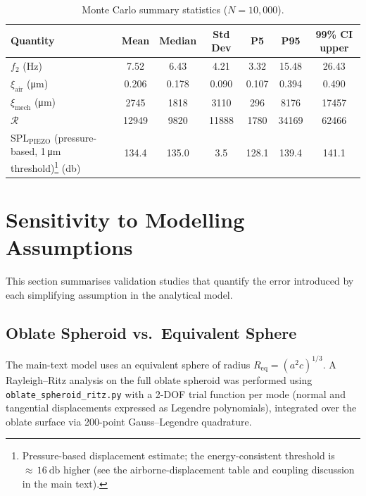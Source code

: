 \documentclass[12pt]{article}
\begin{document}
\begin{table}[htbp]
\centering
\caption{Monte Carlo summary statistics ($N = 10{,}000$).}
\label{tab:mc_summary}
\begin{tabular}{@{}lSSSSSS@{}}
\toprule
{Quantity} & {Mean} & {Median} & {Std Dev} & {P5} & {P95} & {99\% CI upper} \\
\midrule
$f_{2}$ (\si{\hertz})
  & 7.52 & 6.43 & 4.21 & 3.32 & 15.48 & 26.43 \\
$\xi_{\mathrm{air}}$ (\si{\micro\metre})
  & 0.206 & 0.178 & 0.090 & 0.107 & 0.394 & 0.490 \\
$\xi_{\mathrm{mech}}$ (\si{\micro\metre})
  & 2745 & 1818 & 3110 & 296 & 8176 & 17457 \\
$\mathcal{R}$
  & 12949 & 9820 & 11888 & 1780 & 34169 & 62466 \\
SPL$_{\mathrm{PIEZO}}$ (pressure-based, 1\,\si{\micro\metre} threshold)\footnote{Pressure-based displacement
  estimate; the energy-consistent threshold is ${\approx}\,\SI{16}{\decibel}$
  higher (see the airborne-displacement table and coupling discussion in the
  main text).} (\si{\decibel})
  & 134.4 & 135.0 & 3.5 & 128.1 & 139.4 & 141.1 \\
\bottomrule
\end{tabular}
\end{table}


\section{Sensitivity to Modelling Assumptions}
\label{sec:sensitivity}

This section summarises validation studies that quantify the error introduced
by each simplifying assumption in the analytical model.

\subsection{Oblate Spheroid vs.\ Equivalent Sphere}
\label{sec:oblate}

The main-text model uses an equivalent sphere of radius
$R_{\mathrm{eq}} = (a^{2}c)^{1/3}$.  A Rayleigh--Ritz analysis on the full
oblate spheroid was performed using
\texttt{oblate\_spheroid\_ritz.py} with a 2-DOF trial function per mode
(normal and tangential displacements expressed as Legendre polynomials),
integrated over the oblate surface via 200-point Gauss--Legendre quadrature.
\end{document}
